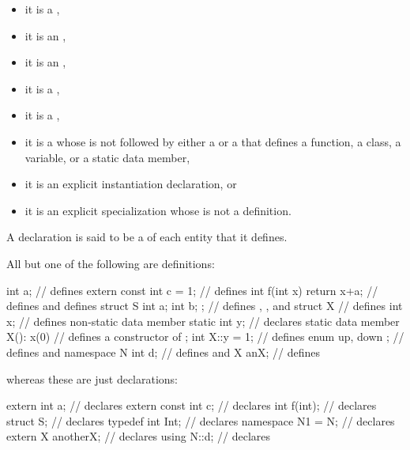 \begin{itemize}
a ,
\item it is
a ,
\item
it is an
,
\item
it is an
,
\item it is
a ,
\item it is
a ,
\item it is
a 
whose  is not followed by
either a  or a 
that defines a function, a class, a variable, or a static data member,
\item it is
an explicit instantiation declaration, or
\item it is
an explicit specialization whose
 is not a definition.
\end{itemize}
A declaration is said to be a  of each entity that it defines.
\begin{example}
All but one of the following are definitions:
\begin{codeblock}
int a;                          // defines 
extern const int c = 1;         // defines 
int f(int x) { return x+a; }    // defines  and defines 
struct S { int a; int b; };     // defines , , and 
struct X {                      // defines 
  int x;                        // defines non-static data member 
  static int y;                 // declares static data member 
  X(): x(0) { }                 // defines a constructor of 
};
int X::y = 1;                   // defines 
enum { up, down };              // defines  and 
namespace N { int d; }          // defines  and 
X anX;                          // defines 

\end{codeblock}
whereas these are just declarations:
\begin{codeblock}
extern int a;                   // declares 
extern const int c;             // declares 
int f(int);                     // declares 
struct S;                       // declares 
typedef int Int;                // declares 
namespace N1 = N;               // declares 
extern X anotherX;              // declares 
using N::d;                     // declares 
\end{codeblock}
\end{example}

